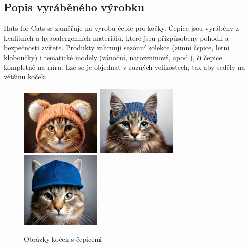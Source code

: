 \documentclass[12pt, a4paper]{article}
\begin{document}
\pagebreak

\subsection{Popis vyráběného výrobku}

Hats for Cats se zaměřuje na výrobu čepic pro kočky. Čepice jsou vyráběny 
z kvalitních a hypoalergenních materiálů, které jsou přizpůsobeny pohodlí a bezpečnosti zvířete.
Produkty zahrnují sezónní kolekce (zimní čepice, letní kloboučky) i tematické modely (vánoční, narozeninové, apod.),
či čepice kompletně na míru. Lze se je objednat v různých velikostech, tak aby seděly na většinu koček.

\begin{figure}[h!]
  \centering
  \includegraphics[width=0.35\textwidth, height=0.3\textwidth]{files/kocka1.png}
  \hspace{0.5cm}
  \vspace{0.5cm}
  \includegraphics[width=0.35\textwidth, height=0.3\textwidth]{files/kocka2.png}
  \hspace{0.5cm}
  \includegraphics[width=0.35\textwidth, height=0.3\textwidth]{files/kocka3.png}
  \caption{Obrázky koček s čepicemi}
\end{figure}
\end{document}
